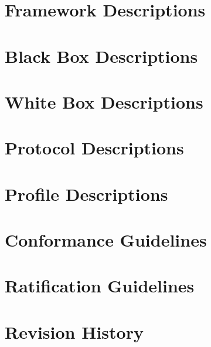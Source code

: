 \documentclass[a4paper]{arrowhead}
\begin{document}
\section{Framework Descriptions}
\label{sec:framework}


\section{Black Box Descriptions}
\label{sec:blackbox}


\section{White Box Descriptions}
\label{sec:whitebox}


\section{Protocol Descriptions}
\label{sec:protocol}


\section{Profile Descriptions}
\label{sec:profile}


\section{Conformance Guidelines}
\label{sec:conformance}


\section{Ratification Guidelines}
\label{sec:ratification}


\renewcommand{\bibsection}{\section{References}\label{sec:references}}



\newpage

\section{Revision History}
\label{sec:revision}
\end{document}
